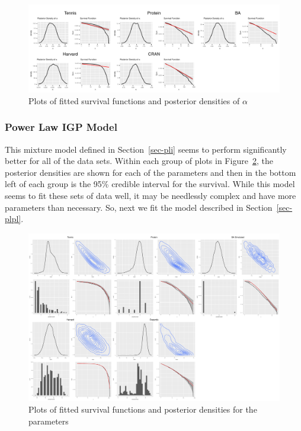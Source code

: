 \documentclass[
]{article}
\begin{document}
\begin{figure}[H]

{\centering \includegraphics{proposal_files/figure-pdf/fig-pl-1.pdf}

}

\caption{\label{fig-pl}Plots of fitted survival functions and posterior
densities of \(\alpha\)}

\end{figure}

\hypertarget{power-law-igp-model}{%
\subsubsection{Power Law IGP Model}\label{power-law-igp-model}}

This mixture model defined in Section~\ref{sec-pli} seems to perform
significantly better for all of the data sets. Within each group of
plots in Figure~\ref{fig-pli}, the posterior densities are shown for
each of the parameters and then in the bottom left of each group is the
95\% credible interval for the survival. While this model seems to fit
these sets of data well, it may be needlessly complex and have more
parameters than necessary. So, next we fit the model described in
Section~\ref{sec-plpl}.

\begin{figure}[H]

{\centering \includegraphics{proposal_files/figure-pdf/fig-pli-1.pdf}

}

\caption{\label{fig-pli}Plots of fitted survival functions and posterior
densities for the parameters}

\end{figure}
\end{document}
